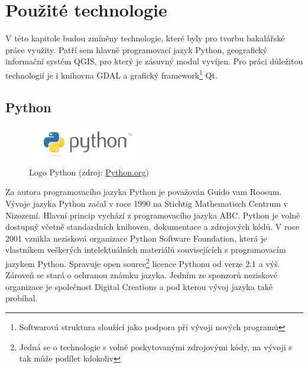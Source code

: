 \chapter{Použité technologie}
\label{3-technologie}
V této kapitole budou zmíněny technologie, které byly pro tvorbu
bakalářské práce využity. Patří sem hlavně programovací jazyk Python,
geografický informační systém QGIS, pro který je zásuvný modul vyvíjen.
Pro práci důležitou technologií je i knihovna GDAL a grafický framework\footnote{Softwarová
  struktura sloužící jako podpora při vývoji nových programů} Qt. 

\section{Python}
\label{sec:python}
\begin{figure}[H]
	 \centering
      \includegraphics[width=5cm]{./pictures/python-logo.png}
      \caption{Logo Python (zdroj:
\href{https://www.python.org/static/community_logos/python-logo-master-v3-TM.png}{Python.org})}
      \label{fig:python}
  \end{figure}

Za autora programovacího jazyka Python je považován Guido vam Roosum.
Vývoje jazyka Python začal v roce 1990 na Stichtig Mathematisch Centrum v Nizozemí. Hlavní princip
vychází z programovacího jazyka ABC. Python je volně dostupný včetně standardních knihoven,
dokumentace a zdrojových kódů. V roce 2001 vznikla nezisková
organizace Python Software Foundation, která je vlastníkem veškerých
intelektuálních materiálů souvisejících s programovacím jazykem
Python. Spravuje open source\footnote{Jedná se o technologie s volně poskytovanými zdrojovými kódy, na vývoji s tak může podílet kdokoliv} licence Pythonu od verze 2.1 a výš. Zároveň se stará o
ochranou známku jazyka. Jedním ze sponzorů neziskové organizace je 
společnost Digital Creations a pod kterou vývoj jazyka také probíhal. \cite{ucebnicepython}


